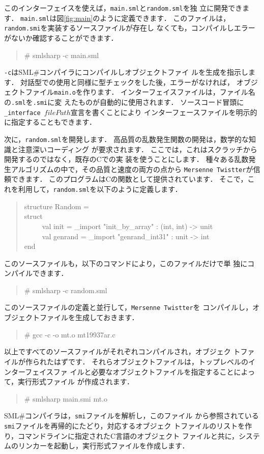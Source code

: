 \documentclass{jbook}
\newcommand{\smlsharp}{SML\#}
\newenvironment{program}{\begin{tt}\begin{quote}}{\end{quote}\end{tt}}
\newcommand{\myem}{\ \ \ \ \  }
\begin{document}
	このインターフェイスを使えば，{\tt main.sml}と{\tt random.sml}を独
立に開発できます．
	{\tt main.sml}は図\ref{fig:main}のように定義できます．
	このファイルは，{\tt random.smi}を実装するソースファイルが存在し
なくても，コンパイルしエラーがないか確認することができます．
\begin{program}
\# smlsharp -c main.sml
\end{program}
	{\tt -c}は\smlsharp{}コンパイラにコンパイルしオブジェクトファイ
ルを生成を指示します．
	対話型での使用と同様に型チェックをした後，エラーがなければ，
オブジェクトファイル{\tt main.o}を作ります．
	インターフェイスファイルは，ファイル名の{\tt .sml}を{\tt .smi}に変
えたものが自動的に使用されます．
	ソースコード冒頭に{\tt \_interface $filePath$}宣言を書くことにより
インターフェースファイルを明示的に指定することもできます．

	次に，{\tt random.sml}を開発します．
	高品質の乱数発生関数の開発は，数学的な知識と注意深いコーディング
が要求されます．
	ここでは，これはスクラッチから開発するのではなく，既存のCでの実
装を使うことにします．
	種々ある乱数発生アルゴリズムの中で，その品質と速度の両方の点から
{\tt Mersenne Twistter}が信頼できます．
	このプログラムはCの関数として提供されています．
	そこで，これを利用して，{\tt random.sml}を以下のように定義します．
\begin{program}
structure Random =\\
struct\\
\myem  val init = \_import "init\_by\_array" : (int, int) -> unit\\
\myem  val genrand = \_import "genrand\_int31" : unit -> int\\
end
\end{program}
	このソースファイルも，以下のコマンドにより，このファイルだけで単
独にコンパイルできます．
\begin{program}
\# smlsharp -c random.sml
\end{program}
	このソースファイルの定義と並行して，{\tt Mersenne Twistter}を
コンパイルし，オブジェクトファイルを生成しておきます．
\begin{program}
\# gcc -c -o mt.o mt19937ar.c
\end{program}
	以上ですべてのソースファイルがそれぞれコンパイルされ，オブジェク
トファイルが作られたはずです．
	それらオブジェクトファイルは，トップレベルのインターフェイスファ
イルと必要なオブジェクトファイルを指定することによって，実行形式ファイル
が作成されます．
\begin{program}
\# smlsharp main.smi mt.o
\end{program}
	\smlsharp{}コンパイラは，{\tt smi}ファイルを解析し，このファイル
から参照されている{\tt smi}ファイルを再帰的にたどり，対応するオブジェク
トファイルのリストを作り，コマンドラインに指定されたC言語のオブジェクト
ファイルと共に，システムのリンカーを起動し，実行形式ファイルを作成します．
	
\end{document}
